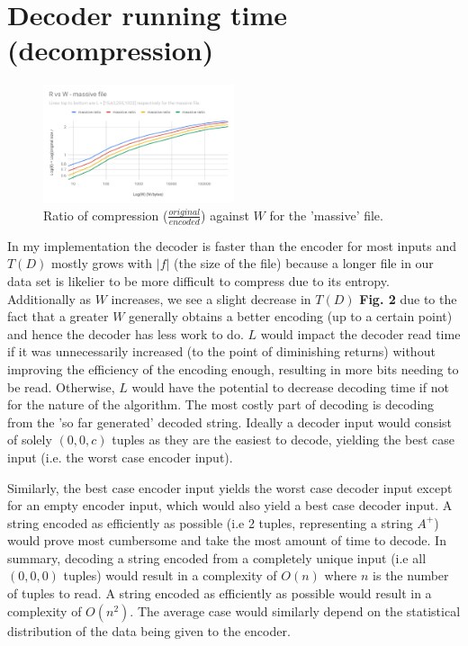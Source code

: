 \documentclass[a4paper, 10pt]{article}
\begin{document}
\section{Decoder running time (decompression)}

\begin{figure}
  \centering
  \includegraphics[width=0.5\textwidth]{RvsWmassivefile.pdf}
  \caption{Ratio of compression ($\frac{original}{encoded}$) against $W$ for the 'massive' file.}
\end{figure}

In my implementation the decoder is faster than the encoder for most inputs and $T(D)$ mostly grows with $|f|$ (the size of the file) because a longer file in our data set is likelier to be more difficult to compress due to its entropy. Additionally as $W$ increases, we see a slight decrease in $T(D)$ \textbf{Fig. 2} due to the fact that a greater $W$ generally obtains a better encoding (up to a certain point) and hence the decoder has less work to do. $L$ would impact the decoder read time if it was unnecessarily increased (to the point of diminishing returns) without improving the efficiency of the encoding enough, resulting in more bits needing to be read. Otherwise, $L$ would have the potential to decrease decoding time if not for the nature of the algorithm. The most costly part of decoding is decoding from the 'so far generated' decoded string. Ideally a decoder input would consist of solely $(0,0,c)$ tuples as they are the easiest to decode, yielding the best case input (i.e. the worst case encoder input).



Similarly, the best case encoder input yields the worst case decoder input except for an empty encoder input, which would also yield a best case decoder input. A string encoded as efficiently as possible (i.e 2 tuples, representing a string $A^+$) would prove most cumbersome and take the most amount of time to decode. In summary, decoding a string encoded from a completely unique input (i.e all $(0,0,0)$ tuples) would result in a complexity of $O(n)$ where $n$ is the number of tuples to read. A string encoded as efficiently as possible would result in a complexity of $O(n^2)$. The average case would similarly depend on the statistical distribution of the data being given to the encoder.
\end{document}
